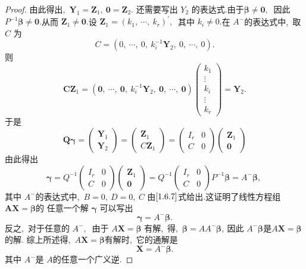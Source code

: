 \begin{proof}
	由此得出,\ $  \boldsymbol{Y}_{1}=\boldsymbol{Z}_{1},\  \boldsymbol{0}=\boldsymbol{Z}_{2} .$
	还需要写出 $ Y_{2}$  的表达式.由于$  \boldsymbol{\beta} \neq \mathbf{0} ,\ $ 因此 $ P^{-1} \boldsymbol{\beta} \neq \mathbf{0} .$从而 $ \boldsymbol{Z}_{1} \neq \mathbf{0}  .$设 $ \boldsymbol{Z}_{1}=   \left(k_{1},\  \cdots,\  k_{r}\right)^{\prime} ,\ $ 其中 $ k_{i} \neq 0 .$在  $A^{-} $的表达式中,\  取  $C$  为
	\begin{equation}
		C=\left(0,\  \cdots,\  0,\  k_{i}^{-1} \mathbf{Y}_{2},\  0,\  \cdots,\  0\right) .\label{1.6.7}
	\end{equation}
	则
	$$\boldsymbol{CZ}_1=\left(\mathbf{0},\  \cdots,\  \mathbf{0},\  k_{i}^{-1} \boldsymbol{Y}_{2},\  \mathbf{0},\  \cdots,\  \mathbf{0}\right)\left(\begin{array}{c}
		k_{1} \\
		\vdots \\
		k_{i} \\
		\vdots \\
		k_{r}
	\end{array}\right)=\boldsymbol{Y}_{2} .$$
	于是
	$$\boldsymbol{Q\gamma}=\left(\begin{array}{l}
		\boldsymbol{Y}_{1} \\
		\boldsymbol{Y}_{2}
	\end{array}\right)=\left(\begin{array}{l}
		\boldsymbol{Z}_{1} \\
		C \boldsymbol{Z}_{1}
	\end{array}\right)=\left(\begin{array}{ll}
		I_{r} & 0 \\
		C & 0
	\end{array}\right)\left(\begin{array}{l}
		\boldsymbol{Z}_{1} \\
		\mathbf{0}
	\end{array}\right)$$
	由此得出
	$$\boldsymbol{\gamma}=Q^{-1}\left(\begin{array}{ll}
		I_{r} & 0 \\
		C & 0
	\end{array}\right)\left(\begin{array}{l}
		\boldsymbol{Z}_{1} \\
		\mathbf{0}
	\end{array}\right)=Q^{-1}\left(\begin{array}{ll}
		I_{r} & 0 \\
		C & 0
	\end{array}\right) P^{-1} \boldsymbol{\beta}=A^{-} \boldsymbol{\beta},\ $$
	其中  $A^{-} $的表达式中,\  $ B=0,\  D=0,\  C$  由$\eqref{1.6.7}$式给出.这证明了线性方程组$   \boldsymbol{AX}=\boldsymbol{\beta}  $的 任意一个解  $\boldsymbol{\gamma} $ 可以写出
	$$\boldsymbol{\gamma}=A^{-} \boldsymbol{\beta} .$$
	反之,\  对于任意的 $ A^{-} ,\ $ 由于 $ A \boldsymbol{X}=\boldsymbol{\beta} $ 有解,\  得,\   $\boldsymbol{\beta}=A A^{-} \boldsymbol{\beta} ,\  $因此 $ A^{-} \boldsymbol{\beta}  是  A \boldsymbol{X}=\boldsymbol{\beta}  $的解.
	综上所述得,\   $A \boldsymbol{X}=\boldsymbol{\beta}  $有解时,\  它的通解是
	$$\boldsymbol{X}=A^{-} \boldsymbol{\beta} .$$
	其中  $A^{-} $是  $A  $的任意一个广义逆.
\end{proof}
